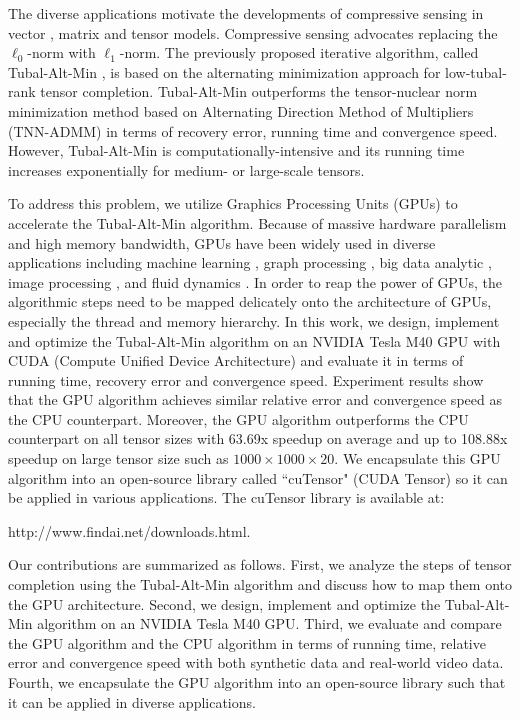 \documentclass[format=acmsmall, review=false, screen=true]{acmart}
\begin{document}
The diverse applications motivate the developments of compressive sensing in vector \cite{candes2006robust} \cite{candes2006near}, matrix \cite{candes2009exact} \cite{candes2010power} and tensor \cite{kolda2009tensor} \cite{kilmer2011factorization} \cite{kilmer2013third} models. Compressive sensing advocates replacing the $\ell_0$-norm with $\ell_1$-norm. The previously proposed iterative algorithm, called Tubal-Alt-Min \cite{XiaoYang2016Low},  is based on the alternating minimization approach for low-tubal-rank tensor completion. Tubal-Alt-Min outperforms the tensor-nuclear norm minimization method based on Alternating Direction Method of Multipliers (TNN-ADMM) \cite{zhang2017exact} in terms of recovery error, running time and convergence speed. However, Tubal-Alt-Min is computationally-intensive and its running time increases exponentially for medium- or large-scale tensors.

To address this problem, we utilize Graphics Processing Units (GPUs) to accelerate the Tubal-Alt-Min algorithm. Because of massive hardware parallelism and high memory bandwidth, GPUs have been widely used in diverse applications including machine learning \cite{cui2016geeps} \cite{brito2017detecting} \cite{campos2017scaling}, graph processing \cite{shi2018frog} \cite{zhong2017optimizing} \cite{pan2017multi}, big data analytic \cite{gutierrez2017smote} \cite{rathore2017real}, image processing \cite{devadithya2017gpu}, and fluid dynamics \cite {verma2017advanced}. In order to reap the power of GPUs, the algorithmic steps need to be mapped delicately onto the architecture of GPUs, especially the thread and memory hierarchy.  In this work, we design, implement and optimize the Tubal-Alt-Min algorithm on an NVIDIA Tesla M40 GPU with CUDA (Compute Unified Device Architecture) and evaluate it in terms of running time, recovery error and convergence speed. Experiment results show that the GPU algorithm achieves similar relative error and convergence speed as the CPU counterpart. Moreover, the GPU algorithm outperforms the CPU counterpart on all tensor sizes with 63.69x speedup on average and up to 108.88x speedup on large tensor size such as $1000 \times 1000 \times 20$. We encapsulate this GPU algorithm into an open-source library called ``cuTensor" (CUDA Tensor) so it can be applied in various applications. The cuTensor library is available at:

 http://www.findai.net/downloads.html.

Our contributions are summarized as follows. First, we analyze the steps of tensor completion using the Tubal-Alt-Min algorithm and discuss how to map them onto the GPU architecture. Second, we design, implement and optimize the Tubal-Alt-Min algorithm on an NVIDIA Tesla M40 GPU. Third, we evaluate and compare the GPU algorithm and the CPU algorithm in terms of running time, relative error and convergence speed with both synthetic data and real-world video data. Fourth, we encapsulate the GPU algorithm into an open-source library such that it can be applied in diverse applications.
\end{document}
